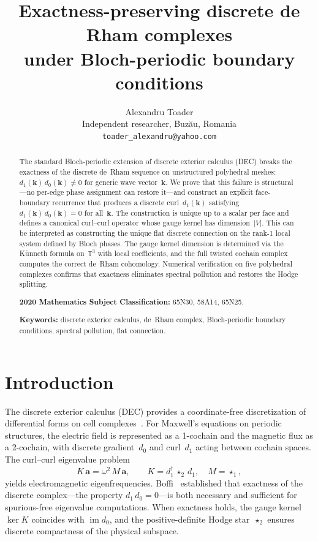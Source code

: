 \documentclass[11pt]{article}
\title{Exactness-preserving discrete de Rham complexes\\
under Bloch-periodic boundary conditions}
\author{Alexandru Toader\\
Independent researcher, Buz\u{a}u, Romania\\
\texttt{toader\_alexandru@yahoo.com}}
\date{}
\theoremstyle{remark}
\newcommand{\bk}{\mathbf{k}}
\newcommand{\TT}{\mathbb{T}}
\newcommand{\im}{\operatorname{im}}
\newcommand{\Ker}{\operatorname{ker}}
\begin{document}
\maketitle

\begin{abstract}
The standard Bloch-periodic extension of discrete exterior calculus (DEC)
breaks the exactness of the discrete de~Rham sequence on unstructured
polyhedral meshes: $d_1(\bk)\,d_0(\bk) \neq 0$ for generic wave vector~$\bk$.
We prove that this failure is structural---no per-edge phase assignment can
restore it---and construct an explicit face-boundary recurrence that produces
a discrete curl~$d_1(\bk)$ satisfying $d_1(\bk)\,d_0(\bk) = 0$ for
all~$\bk$. The construction is unique up to a scalar per face and defines a
canonical curl--curl operator whose gauge kernel has dimension~$|V|$. This can
be interpreted as constructing the unique flat discrete connection on the
rank-1 local system defined by Bloch phases. The gauge kernel dimension is
determined via the K\"unneth formula on~$\TT^3$ with local coefficients, and
the full twisted cochain complex computes the correct de~Rham cohomology.
Numerical verification on five polyhedral complexes confirms that exactness
eliminates spectral pollution and restores the Hodge splitting.

\medskip\noindent
\textbf{2020 Mathematics Subject Classification:} 65N30, 58A14, 65N25.

\medskip\noindent
\textbf{Keywords:} discrete exterior calculus, de~Rham complex,
Bloch-periodic boundary conditions, spectral pollution, flat connection.
\end{abstract}

\section{Introduction}

The discrete exterior calculus (DEC) provides a coordinate-free
discretization of differential forms on cell complexes~\cite{Desbrun2005,Hirani2003}.
For Maxwell's equations on periodic structures, the electric field is
represented as a 1-cochain and the magnetic flux as a 2-cochain, with
discrete gradient~$d_0$ and curl~$d_1$ acting between cochain spaces.
The curl--curl eigenvalue problem
\begin{equation}\label{eq:eigenvalue}
K\,\mathbf{a} = \omega^2\,M\,\mathbf{a}, \qquad
K = d_1^\dagger\,\star_2\,d_1, \quad M = \star_1,
\end{equation}
yields electromagnetic eigenfrequencies. Boffi~\cite{Boffi2010} established
that exactness of the discrete complex---the property $d_1\,d_0 = 0$---is
both necessary and sufficient for spurious-free eigenvalue computations.
When exactness holds, the gauge kernel $\Ker K$ coincides with $\im d_0$,
and the positive-definite Hodge star~$\star_2$ ensures discrete compactness
of the physical subspace.
\end{document}
